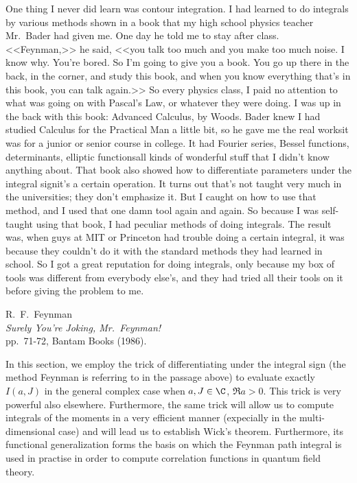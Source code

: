 \begin{quoting}%
   \openquote One thing I never did learn was contour integration. I had learned
   to do integrals by various methods shown in a book that my high school
   physics teacher Mr.~Bader had given me.  One day he told me to stay after
   class. <<Feynman,>> he said, <<you talk too much and you make too much noise.
   I know why. You're bored. So I'm going to give you a book. You go up there in
   the back, in the corner, and study this book, and when you know everything
   that's in this book, you can talk again.>> 
   So every physics class, I paid no
   attention to what was going on with Pascal's Law, or whatever they were
   doing. 
   \textelp{}
   I was up in the back with this book: Advanced Calculus, by Woods.
   Bader knew I had studied Calculus for the Practical Man a little bit, so he
   gave me the real works\textemdash it was for a junior or senior course in
   college. It had Fourier series, Bessel functions, determinants, elliptic
   functions\textemdash all kinds of wonderful stuff that I didn't know anything
   about. 
   That book also showed how to differentiate parameters under the
   integral sign\textemdash it's a certain operation. It turns out that's not
   taught very much in the universities; they don't emphasize it. But I caught
   on how to use that method, and I used that one damn tool again and again. 
   So
   because 
   I was self-taught using that book, I had peculiar methods of doing
   integrals. 
   \textelp{}
   The result was, when guys at MIT or Princeton had trouble doing a
   certain integral, it was because they couldn't do it with the standard
   methods they had learned in school.
   \textelp{}
   So I got a great reputation for doing integrals, only because my
   box of tools was different from everybody else's, and they had tried all
   their tools on it before giving the problem to me.~\closequote
   \begin{signature}
       R.~F.~Feynman \\
       \emph{Surely You're Joking, Mr.~Feynman!}\\
       pp.~71-72, Bantam Books (1986).
\end{signature}
\end{quoting}

\par\noindent
In this section, we employ the trick of 
differentiating under the integral sign (the method Feynman is referring to in
the passage above) to evaluate exactly $I(a,J)$ in the general complex case
when  $a,J\in\C$, $\Re a>0$.
This trick is very
powerful also elsewhere. Furthermore, the same trick will allow us to compute
integrals of the moments in a very efficient manner (expecially in the
multi-dimensional case) and will lead us to establish Wick's theorem. 
Furthermore, its functional generalization forms the basis on which the Feynman path integral is
used in practise in order to compute correlation functions in quantum field
theory.

